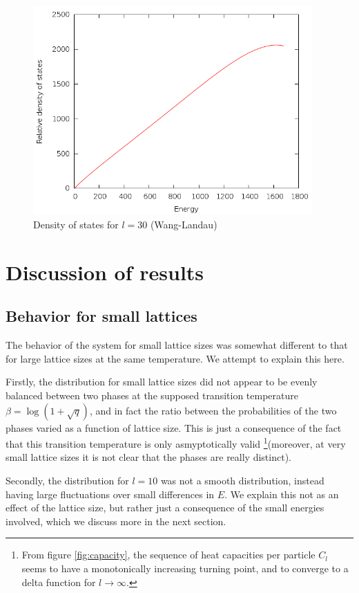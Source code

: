 \documentclass{article}
\begin{document}
\begin{figure}[h]
\includegraphics[height=8cm]{../results/wanglandau/s30.png}
\caption{Density of states for $l = 30$ (Wang-Landau)}
\label{fig:s30}
\end{figure}

\section{Discussion of results}
\subsection{Behavior for small lattices}
The behavior of the system for small lattice sizes was somewhat different to that for large lattice sizes at the same temperature.
We attempt to explain this here.

Firstly, the distribution for small lattice sizes did not appear to be evenly balanced between two phases at the supposed transition temperature $\beta = \log(1+\sqrt q)$, and in fact the ratio between the probabilities of the two phases varied as a function of lattice size.
This is just a consequence of the fact that this transition temperature is only asmyptotically valid \footnote{From figure \ref{fig:capacity}, the sequence of heat capacities per particle $C_l$ seems to have a monotonically increasing turning point, and to converge to a delta function for $l \rightarrow \infty$.}(moreover, at very small lattice sizes it is not clear that the phases are really distinct).

Secondly, the distribution for $l = 10$ was not a smooth distribution, instead having large fluctuations over small differences in $E$.
We explain this not as an effect of the lattice size, but rather just a consequence of the small energies involved, which we discuss more in the next section.
\end{document}
